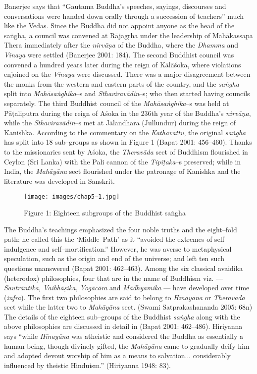 Banerjee says that “Gautama Buddha’s speeches, sayings, discourses and conversations were handed down orally through a succession of teachers” much like the Vedas. Since the Buddha did not appoint anyone as the head of the saṅgha, a council was convened at Rājagṛha under the leadership of Mahākassapa Thera immediately after the \textit{nirvāṇa} of the Buddha, where the \textit{Dhamma} and \textit{Vinaya} were settled (Banerjee 2001: 184). The second Buddhist council was convened a hundred years later during the reign of Kālāśoka, where violations enjoined on the \textit{Vinaya} were discussed. There was a major disagreement between the monks from the western and eastern parts of the country, and the \textit{saṅgha} split into \textit{Mahāsaṅghika}–s and \textit{Sthaviravādin}–s; who then started having councils separately. The third Buddhist council of the \textit{Mahāsaṅghika}–s was held at Pāṭaliputra during the reign of Aśoka in the 236th year of the Buddha’s \textit{nirvāṇa}, while the \textit{Sthaviravādin}–s met at Jālandhara (Jullundur) during the reign of Kanishka. According to the commentary on the \textit{Kathāvattu}, the original \textit{saṅgha} has split into 18 sub–groups as shown in Figure 1 (Bapat 2001: 456–460). Thanks to the missionaries sent by Aśoka, the \textit{Theravāda} sect of Buddhism flourished in Ceylon (Sri Lanka) with the Pali cannon of the \textit{Tipiṭaka}–s preserved; while in India, the \textit{Mahāyāna} sect flourished under the patronage of Kanishka and the literature was developed in Sanskrit.

\begin{figure}
\texttt{[image: images/chap5–1.jpg]}
\caption{Figure 1: Eighteen subgroups of the Buddhist saṅgha}
\end{figure}

The Buddha’s teachings emphasized the four noble truths and the eight–fold path; he called this the ‘Middle–Path’ as it “avoided the extremes of self–indulgence and self–mortification.” However, he was averse to metaphysical speculation, such as the origin and end of the universe; and left ten such questions unanswered (Bapat 2001: 462–463). Among the six classical avaidika (heterodox) philosophies, four that are in the name of Buddhism viz. — \textit{Sautrāntika, Vaibhāṣika, Yogācāra} and \textit{Mādhyamika} — have developed over time (\textit{infra}). The first two philosophies are said to belong to \textit{Hīnayāna} or \textit{Theravāda} sect while the latter two to \textit{Mahāyāna} sect. (Swami Satprakashananda 2005: 68n) The details of the eighteen sub–groups of the Buddhist \textit{saṅgha} along with the above philosophies are discussed in detail in (Bapat 2001: 462–486). Hiriyanna says “while \textit{Hīnayāna} was atheistic and considered the Buddha as essentially a human being, though divinely gifted, the \textit{Mahāyāna} came to gradually deify him and adopted devout worship of him as a means to salvation... considerably influenced by theistic Hinduism.” (Hiriyanna 1948: 83).

